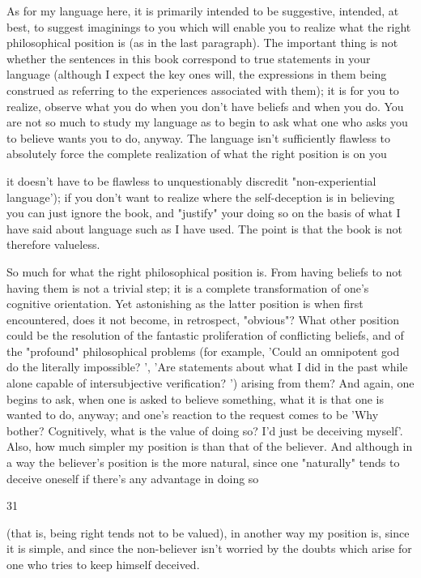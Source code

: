 \documentclass[10pt,twoside]{memoir}
\begin{document}
\begin{enumerate}
{{{{As for my language here, it is primarily intended to be suggestive, 
intended, at best, to suggest imaginings to you which will enable you to 
realize what the right philosophical position is (as in the last paragraph). The 
important thing is not whether the sentences in this book correspond to true 
statements in your language (although I expect the key ones will, the 
expressions in them being construed as referring to the experiences 
associated with them); it is for you to realize, observe what you do when 
you don't have beliefs and when you do. You are not so much to study my 
language as to begin to ask what one who asks you to believe wants you to 
do, anyway. The language isn't sufficiently flawless to absolutely force the 
complete realization of what the right position is on you {it doesn't have to 
be flawless to unquestionably discredit "non-experiential language'); if you 
don't want to realize where the self-deception is in believing you can just 
ignore the book, and "justify" your doing so on the basis of what I have said 
about language such as I have used. The point is that the book is not 
therefore valueless. 

So much for what the right philosophical position is. From having 
beliefs to not having them is not a trivial step; it is a complete 
transformation of one's cognitive orientation. Yet astonishing as the latter 
position is when first encountered, does it not become, in retrospect, 
"obvious"? What other position could be the resolution of the fantastic 
proliferation of conflicting beliefs, and of the "profound" philosophical 
problems (for example, 'Could an omnipotent god do the literally 
impossible? ', 'Are statements about what I did in the past while alone 
capable of intersubjective verification? ') arising from them? And again, one 
begins to ask, when one is asked to believe something, what it is that one is 
wanted to do, anyway; and one's reaction to the request comes to be 'Why 
bother? Cognitively, what is the value of doing so? I'd just be deceiving 
myself'. Also, how much simpler my position is than that of the believer. 
And although in a way the believer's position is the more natural, since one 
"naturally" tends to deceive oneself if there's any advantage in doing so 


31 


(that is, being right tends not to be valued), in another way my position is, 
since it is simple, and since the non-believer isn't worried by the doubts 
which arise for one who tries to keep himself deceived. 

}}}}}
\end{enumerate}
\end{document}
